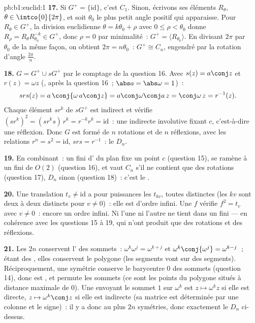 \begin{solution}{pb:b1:euclid:1}
\textbf{17.} Si $G^{+} = \{\mathrm{id}\}$, c'est $C_1$.
Sinon, écrivons ses éléments $R_\theta$, $\theta \in
\intco{0}{2\pi}$, et soit $\theta_0$ le plus petit angle positif
qui apparaisse. Pour $R_\theta \in G^{+}$, la division euclidienne
$\theta = k\theta_0 + \rho$ avec $0 \leq \rho < \theta_0$ donne
$R_\rho = R_\theta R_{\theta_0}^{-k} \in G^{+}$, donc $\rho = 0$
par minimalité~: $G^{+} = \langle R_{\theta_0}\rangle$. En divisant
$2\pi$ par $\theta_0$ de la même façon, on obtient $2\pi =
n\theta_0$~: $G^{+} \cong C_n$, engendré par la rotation d'angle
$\frac{2\pi}n$.

\textbf{18.} $G = G^{+} \cup sG^{+}$ par le comptage de la
question 16. Avec $s(z) = a\conj z$ et $r(z) = \omega z$
(, après la question 16~; $\abs a = \abs\omega =
1$)~:
\[
s r s(z) = a\,\conj{\omega\,a\conj z}
= a\conj\omega\conj a\,z = \conj\omega\,z = r^{-1}(z) .
\]
Chaque élément $sr^k$ de $sG^{+}$ est indirect et vérifie
$(sr^k)^2 = (sr^ks)\,r^k = r^{-k}r^k = \mathrm{id}$~: une 
indirecte involutive fixant $c$, c'est-à-dire une réflexion. Donc
$G$ est formé de $n$ rotations et de $n$ réflexions, avec les
relations $r^n = s^2 = \mathrm{id}$, $srs = r^{-1}$~: le
 $D_n$.

\textbf{19.} En combinant~: un  fini d' du plan
fixe un point $c$ (question 15), se ramène à un  fini
de $O(2)$ (question 16), et vaut $C_n$ s'il ne contient que des
rotations (question 17), $D_n$ sinon (question 18)~:
c'est le \emph{}.

\textbf{20.} Une translation $t_v \neq \mathrm{id}$ a pour
puissances les $t_{kv}$, toutes distinctes (les $kv$ sont deux à
deux distincts pour $v \neq 0$)~: elle est d'ordre infini. Une
 $f$ vérifie $f^2 = t_v$ avec $v \neq 0$~: encore
un ordre infini. Ni l'une ni l'autre ne tient dans un  fini
--- en cohérence avec les questions 15 à 19, qui n'ont produit que
des rotations et des réflexions.

\textbf{21.} Les $2n$  conservent l' des
sommets~: $\omega^k \omega^j = \omega^{k+j}$ et
$\omega^k\conj{\omega^j} = \omega^{k-j}$~; étant des ,
elles conservent le polygone (les segments vont sur des segments).
Réciproquement, une symétrie conserve le barycentre $0$ des sommets
(question 14), donc est , et permute les sommets (ce sont
les points du polygone situés à distance maximale de $0$). Une
  envoyant le sommet $1$ sur $\omega^k$ est $z
\mapsto \omega^k z$ si elle est directe, $z \mapsto \omega^k\conj
z$ si elle est indirecte (sa matrice est déterminée par une colonne
et le signe)~: il y a donc au plus $2n$ symétries, donc exactement
le $D_n$ ci-dessus.


\end{solution}

